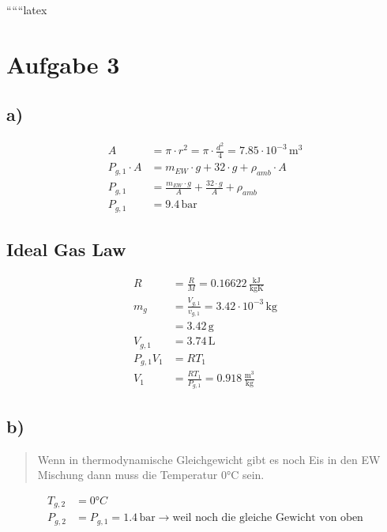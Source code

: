 
``````latex


\section*{Aufgabe 3}

\subsection*{a)}

\begin{align*}
A &= \pi \cdot r^2 = \pi \cdot \frac{d^2}{4} = 7.85 \cdot 10^{-3} \, \text{m}^3 \\
P_{g,1} \cdot A &= m_{EW} \cdot g + 32 \cdot g + \rho_{amb} \cdot A \\
P_{g,1} &= \frac{m_{EW} \cdot g}{A} + \frac{32 \cdot g}{A} + \rho_{amb} \\
P_{g,1} &= 9.4 \, \text{bar}
\end{align*}

\subsection*{Ideal Gas Law}

\begin{align*}
R &= \frac{R}{M} = 0.16622 \, \frac{\text{kJ}}{\text{kgK}} \\
m_g &= \frac{V_{g,1}}{v_{g,1}} = 3.42 \cdot 10^{-3} \, \text{kg} \\
&= 3.42 \, \text{g} \\
V_{g,1} &= 3.74 \, \text{L} \\
P_{g,1} V_1 &= RT_1 \\
V_1 &= \frac{RT_1}{P_{g,1}} = 0.918 \, \frac{\text{m}^3}{\text{kg}}
\end{align*}

\subsection*{b)}

\begin{quote}
Wenn in thermodynamische Gleichgewicht gibt es noch Eis in den EW Mischung dann muss die Temperatur 0°C sein.
\end{quote}

\begin{align*}
T_{g,2} &= 0°C \\
P_{g,2} &= P_{g,1} = 1.4 \, \text{bar} \rightarrow \text{weil noch die gleiche Gewicht von oben}
\end{align*}

